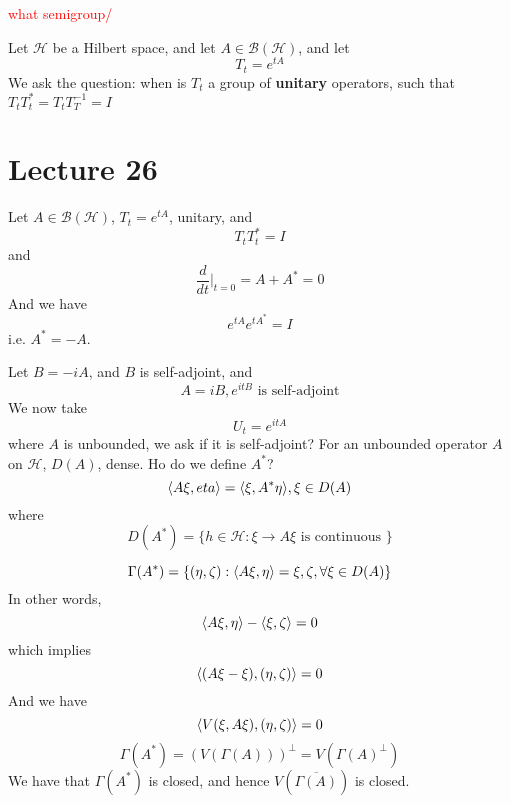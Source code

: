 \begin{note}
    \textcolor{red}{what semigroup/}
\end{note}

Let $\mathcal{H}$ be a Hilbert space, and let $A\in\mathcal{B}(\mathcal{H})$, and let 
\begin{equation*}
    T_t=e^{tA}
\end{equation*} 
We ask the question: when is $T_t$ a group of \textbf{unitary} operators, such that $T_tT_t^*=T_tT_T^{-1}=I$  


\section{Lecture 26}
Let $A\in\mathcal{B}(\mathcal{H})$,  $T_t=e^{tA}$, unitary, and
\begin{equation*}
    T_tT_t^*=I
\end{equation*}
and 
\begin{equation*}
    \frac{d}{dt}\vert_{t=0}=A+A^*=0
\end{equation*}
And we have
\begin{equation*}
    e^{tA}e^{tA^*}=I
\end{equation*}
i.e. $A^*=-A$.

Let $B=-iA$, and $B$ is self-adjoint, and 
\begin{equation*}
    A=iB, e^{itB}\text{ is self-adjoint}
\end{equation*}
We now take
\begin{equation*}
    U_t=e^{itA}
\end{equation*}
where $A$ is unbounded, we ask if it is self-adjoint?
For an unbounded operator $A$ on $\mathcal{H}$, $D(A)$, dense.
Ho do we define $A^*$?
\begin{equation*}
    \langle A\xi, eta\rangle=\langle \xi, A^*\eta\rangle, \xi\in D(A)
\end{equation*}
where
\begin{equation*}
    D(A^*)=\{h\in\mathcal{H}: \xi\to A\xi \text{ is continuous }\}
\end{equation*}

\begin{equation*}
    \Gamma(A^*)=\{(\eta,\zeta):\langle A\xi, \eta\rangle=\xi, \zeta, \forall\xi\in D(A)\} 
\end{equation*}
In other words,
\begin{equation*}
    \langle A\xi, \eta\rangle-\langle \xi, \zeta\rangle=0
\end{equation*}
which implies
\begin{equation*}
    \langle(A\xi-\xi), (\eta, \zeta)\rangle=0
\end{equation*}
And we have
\begin{equation*}
    \langle V(\xi, A\xi), (\eta, \zeta)\rangle=0
\end{equation*}
\begin{equation*}
    \Gamma(A^*)=(V(\Gamma(A)))^\perp=V(\Gamma(A)^\perp)
\end{equation*}
We have that $\Gamma(A^*)$ is closed, and hence $V(\overline{\Gamma(A)})$ is closed.

